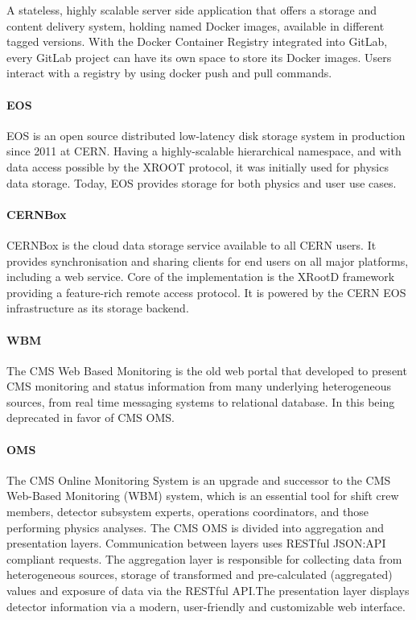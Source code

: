 A stateless, highly scalable server side application that offers a storage and content delivery system, holding named Docker images, available in different tagged versions. With the Docker Container Registry integrated into GitLab, every GitLab project can have its own space to store its Docker images. Users interact with a registry by using docker push and pull commands.

\paragraph{EOS}

EOS \cite{Peters_2015} is an open source distributed low-latency disk storage system in production since 2011 at CERN. Having a highly-scalable hierarchical namespace, and with data access possible by the XROOT protocol, it was initially used for physics data storage. Today, EOS provides storage for both physics and user use cases.

\paragraph{CERNBox}

CERNBox \cite{Mascetti_2015} is the cloud data storage service available to all CERN users. It provides synchronisation and sharing clients for end users on all major platforms, including a web service. Core of the implementation is the XRootD framework providing a feature-rich remote access protocol. It is powered by the CERN EOS infrastructure as its storage backend.

\paragraph{WBM} The CMS Web Based Monitoring \cite{badgett2014web} is the old web portal that developed to present CMS monitoring and status information from many underlying heterogeneous sources, from real time messaging systems to relational database. In this being deprecated in favor of CMS OMS.

\paragraph{OMS} The CMS Online Monitoring System \cite{Andre2649402} is an upgrade and successor to the CMS Web-Based Monitoring (WBM) system, which is an essential tool for shift crew members, detector subsystem experts, operations coordinators, and those performing physics analyses. The CMS OMS is divided into aggregation and presentation layers. Communication between layers uses RESTful JSON:API compliant requests. The aggregation layer is responsible for collecting data from heterogeneous sources, storage of transformed and pre-calculated (aggregated) values and exposure of data via the RESTful API.The presentation layer displays detector information via a modern, user-friendly and customizable web interface.

